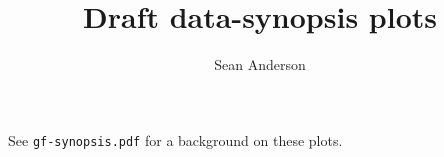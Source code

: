 \documentclass[12pt]{article}
\title{Draft data-synopsis plots}
\author{Sean Anderson}
\begin{document}
\maketitle

See \texttt{gf-synopsis.pdf} for a background on these plots.

\clearpage




\end{document}
